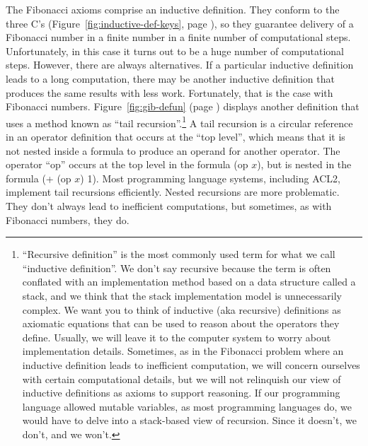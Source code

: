 The Fibonacci axioms comprise an
inductive definition.
They conform to the three C's
(Figure~\ref{fig:inductive-def-keys}, page \pageref{fig:inductive-def-keys}),
so they guarantee delivery of a Fibonacci number in a finite number
in a finite number of computational steps.
Unfortunately, in this case it turns out to be
a huge number of computational steps.
However, there are always alternatives.
If a particular inductive definition leads to a long computation,
there may be another inductive definition that produces the same
results with less work.
Fortunately, that is the case with Fibonacci numbers.
Figure~\ref{fig:gib-defun} (page \pageref{fig:gib-defun})
displays another definition that uses a method known as
``tail recursion''.\footnote{``Recursive definition''
is the most commonly used term for what we call ``inductive definition''.
We don't say recursive because the term is often conflated
with an implementation method based on a data structure called a stack,
and we think that the stack implementation model
is unnecessarily complex. We want you to think of inductive (aka recursive)
definitions as axiomatic equations that can be used to reason about the
operators they define. Usually, we will leave it to the computer system
to worry about implementation details. Sometimes, as in the Fibonacci problem
where an inductive definition leads to inefficient computation, we will
concern ourselves with certain computational details,
but we will not relinquish our view of inductive definitions
as axioms to support reasoning. If our programming language allowed
mutable variables, as most programming languages do, we would have
to delve into a stack-based view of recursion.
Since it doesn't, we don't, and we won't.}
A tail recursion is a circular reference in an operator definition
that occurs at the
``top level'',
which means that it is not nested
inside a formula to produce an operand for
another operator. The operator ``op'' occurs at the top level
in the formula (op $x$), but is nested in the formula (+ (op $x$) 1).
Most programming language systems, including ACL2,
implement tail recursions efficiently. Nested recursions are
more problematic. They don't always lead to inefficient computations,
but sometimes, as with Fibonacci numbers, they do.

